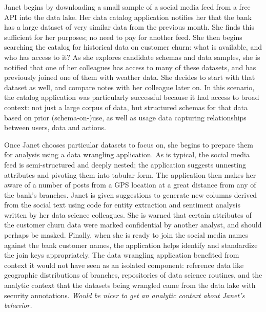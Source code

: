 \documentclass{sig-alternate}
\begin{document}
Janet 
begins by downloading a small sample of a social media feed from a free API into the data lake. Her data catalog application notifies her that the bank has a large dataset of very similar data from the previous month. She finds this sufficient for her purposes; no need to pay for another feed. She then begins searching the catalog for historical data on customer churn: what is available, and who has access to it?  As she explores candidate schemas and data samples, she is notified that one of her colleagues has access to many of these datasets, and has previously joined one of them with weather data. She decides to start with that dataset as well, and compare notes with her colleague later on.  In this scenario, the catalog application was particularly successful because it had access to broad context: not just a large corpus of data, but structured schemas for that data based on prior (schema-on-)use, as well as usage data capturing relationships between users, data and actions.

Once Janet chooses particular datasets to focus on, she begins to prepare them for analysis using a data wrangling application. As is typical, the social media feed is semi-structured and deeply nested; the application suggests unnesting attributes and pivoting them into tabular form.  The application then makes her aware of a number of posts from a GPS location at a great distance from any of  the bank's branches. Janet is given suggestions to generate new columns derived from the social text using code for entity extraction and sentiment analysis written by her data science colleagues. She is warned that certain attributes of the customer churn data were marked confidential by another analyst, and should perhaps be masked. Finally, when she is ready to join the social media names against the bank customer names, the application helps identify and standardize the join keys appropriately. The data wrangling application benefited from context it would not have seen as an isolated component: reference data like geographic distributions of branches, repositories of data science routines, and the analytic context that the datasets being wrangled came from the data lake with security annotations. \emph{Would be nicer to get an analytic context about Janet's behavior.}
\end{document}
